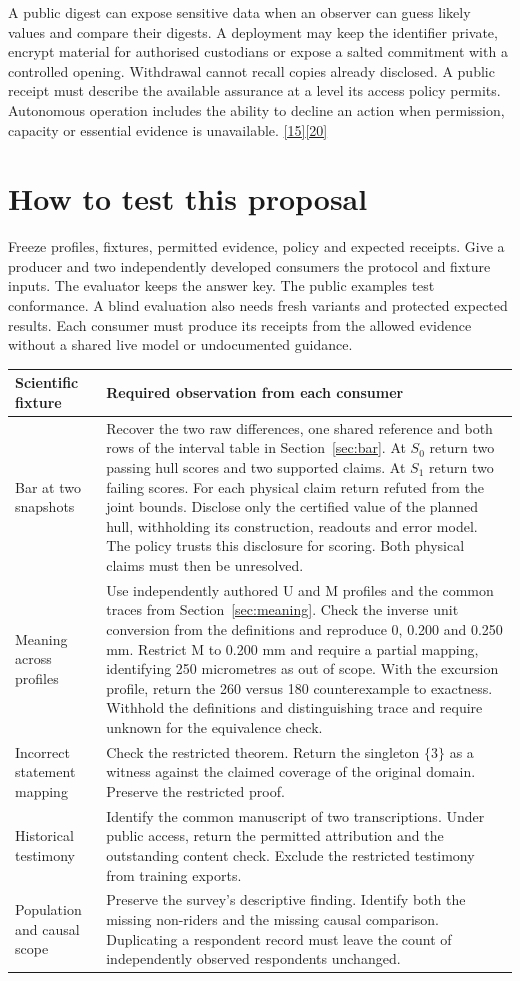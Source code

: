 \documentclass[11pt,a4paper]{article}
\newcommand{\partpage}[1]{\clearpage\section{#1}}
\newcommand{\src}[1]{\hyperlink{ref#1}{[#1]}}
\begin{document}
A public digest can expose sensitive data when an observer can guess likely values and compare their digests. A deployment may keep the identifier private, encrypt material for authorised custodians or expose a salted commitment with a controlled opening. Withdrawal cannot recall copies already disclosed. A public receipt must describe the available assurance at a level its access policy permits. Autonomous operation includes the ability to decline an action when permission, capacity or essential evidence is unavailable. \src{15}\src{20}

\partpage{How to test this proposal}
Freeze profiles, fixtures, permitted evidence, policy and expected receipts. Give a producer and two independently developed consumers the protocol and fixture inputs. The evaluator keeps the answer key. The public examples test conformance. A blind evaluation also needs fresh variants and protected expected results. Each consumer must produce its receipts from the allowed evidence without a shared live model or undocumented guidance.

\small
\begin{tabularx}{\linewidth}{@{}L{.23\linewidth}Y@{}}
\toprule
\textbf{Scientific fixture} & \textbf{Required observation from each consumer} \\ \midrule
Bar at two snapshots & Recover the two raw differences, one shared reference and both rows of the interval table in Section~\ref{sec:bar}. At $S_0$ return two passing hull scores and two supported claims. At $S_1$ return two failing scores. For each physical claim return refuted from the joint bounds. Disclose only the certified value of the planned hull, withholding its construction, readouts and error model. The policy trusts this disclosure for scoring. Both physical claims must then be unresolved. \\
Meaning across profiles & Use independently authored U and M profiles and the common traces from Section~\ref{sec:meaning}. Check the inverse unit conversion from the definitions and reproduce 0, 0.200 and 0.250 mm. Restrict M to 0.200 mm and require a partial mapping, identifying 250 micrometres as out of scope. With the excursion profile, return the 260 versus 180 counterexample to exactness. Withhold the definitions and distinguishing trace and require unknown for the equivalence check. \\
Incorrect statement mapping & Check the restricted theorem. Return the singleton $\{3\}$ as a witness against the claimed coverage of the original domain. Preserve the restricted proof. \\
Historical testimony & Identify the common manuscript of two transcriptions. Under public access, return the permitted attribution and the outstanding content check. Exclude the restricted testimony from training exports. \\
Population and causal scope & Preserve the survey's descriptive finding. Identify both the missing non-riders and the missing causal comparison. Duplicating a respondent record must leave the count of independently observed respondents unchanged. \\
\bottomrule
\end{tabularx}
\normalsize
\end{document}
